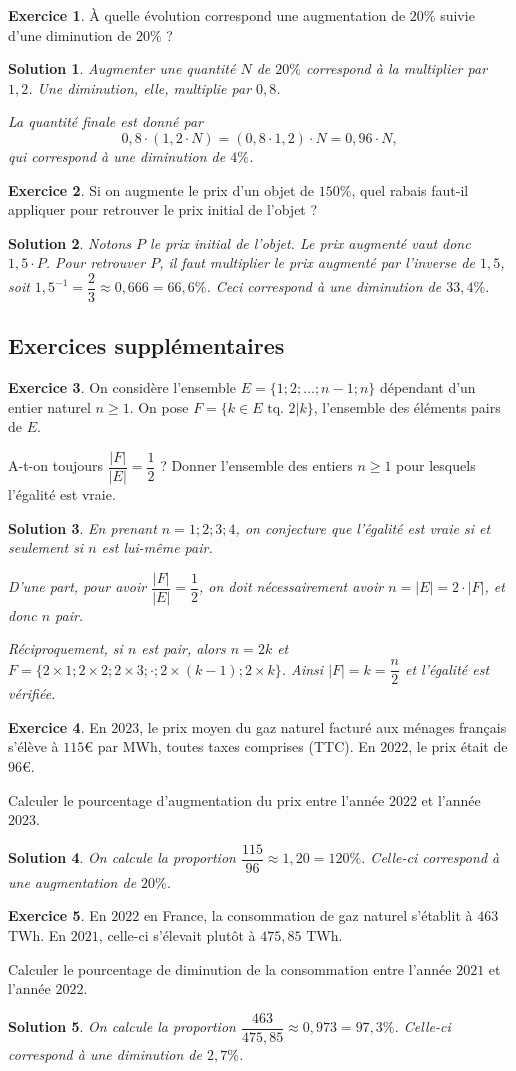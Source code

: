 \documentclass[a4paper, 14pt]{extarticle}
\theoremstyle{plain}
\newtheorem*{sol}{Solution}
\theoremstyle{definition}
\newtheorem{ex}{Exercice}
\newcommand{\exe}[2]{
		\begin{ex} #1  \end{ex}
		\begin{sol} #2 \end{sol}
	}
\newcommand{\exe}[2]{
		\begin{ex} #1  \end{ex}
	}
\begin{document}
\exe{
        À quelle évolution correspond une augmentation de $20\%$ suivie d'une diminution de $20\%$ ?
}{
	Augmenter une quantité $N$ de $20\%$ correspond à la multiplier par $1,2$.
	Une diminution, elle, multiplie par $0,8$.
	
	La quantité finale est donné par 
		\[ 0,8 \cdot (1,2 \cdot N) = (0,8 \cdot 1,2) \cdot N = 0,96 \cdot N, \]
	qui correspond à une diminution de $4\%$.
}

\exe{
  Si on augmente le prix d'un objet de $150\%$, quel rabais faut-il appliquer pour retrouver le prix initial de l'objet ?
}{
	Notons $P$ le prix initial de l'objet.
	Le prix augmenté vaut donc $1,5 \cdot P$.
	Pour retrouver $P$, il faut multiplier le prix augmenté par l'inverse de $1,5$, soit $1,5^{-1} = \dfrac23 \approx 0,666 = 66,6\%$.
	Ceci correspond à une diminution de $33,4\%$.
}

\subsection*{Exercices supplémentaires}

\exe{
        On considère l'ensemble $E= \{1; 2; \dots ; n-1 ; n\}$ dépendant d'un entier naturel $n\geq1$.
        On pose $F = \{k \in E \text{ tq. } 2 | k\}$, l'ensemble des éléments pairs de $E$.

        A-t-on toujours $\dfrac{|F|}{|E|} = \dfrac12$ ? Donner l'ensemble des entiers $n\geq1$ pour lesquels l'égalité est vraie.
}{
	En prenant $n=1; 2; 3; 4$, on conjecture que l'égalité est vraie si et seulement si $n$ est lui-même pair.
	
	D'une part, pour avoir $\dfrac{|F|}{|E|} = \dfrac12$, on doit nécessairement avoir $n = |E| = 2 \cdot |F|$, et donc $n$ pair.
	
	Réciproquement, si $n$ est pair, alors $n=2k$ et $F = \{ 2\times1; 2\times2; 2\times3; \cdot ; 2\times(k-1) ; 2 \times k\}$.
	Ainsi $|F| = k = \dfrac{n}2$ et l'égalité est vérifiée. 
}

\exe{
  En $2023$, le prix moyen du gaz naturel facturé aux ménages français s'élève à $115$€ par MWh, toutes taxes comprises (TTC).
  En $2022$, le prix était de $96$€.

  Calculer le pourcentage d'augmentation du prix entre l'année $2022$ et l'année $2023$.
}{
	On calcule la proportion $\dfrac{115}{96} \approx 1,20 = 120\%$.
	Celle-ci correspond à une augmentation de $20\%$.
}

\exe{
  En $2022$ en France, la consommation de gaz naturel s'établit à $463$ TWh.
  En $2021$, celle-ci s'élevait plutôt à $475{,}85$ TWh.

  Calculer le pourcentage de diminution de la consommation entre l'année $2021$ et l'année $2022$.
}{
	On calcule la proportion $\dfrac{463}{475{,}85} \approx 0,973 = 97,3\%$.
	Celle-ci correspond à une diminution de $2,7\%$.
}
\end{document}

